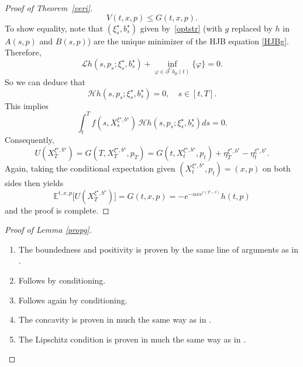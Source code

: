 \documentclass[reqno, 11pt]{amsart}%
\newcommand{\Eop}{\mathbb{E}}
\theoremstyle{definition}
\numberwithin{equation}{section} \numberwithin{theorem}{section}
\begin{document}
\begin{proof}[Proof of Theorem~\ref{veri}]
\begin{equation}
   V(t,x,p) \le G(t,x,p).
   \end{equation} 
   To show equality, note that  $(\xi^\star_s,b^\star_s)$ given by~\eqref{optstr} (with $g$ replaced by $h$ in $A(s,p)$ and $B(s,p)$) are the unique minimizer of the HJB equation \eqref{HJBg}. 
   Therefore, 
   \begin{equation*}
   \mathcal{L} h(s,p_s;\xi^{\star}_s,b^\star_s) + \inf_{\varphi\in\partial^C h_p(t)}\{\varphi\} = 0.
   \end{equation*}
   So we can deduce that
   \begin{equation*}
   \mathcal{H} h(s,p_{s};\xi^{\star}_s,b^{\star}_s) = 0,\quad s\in[t,T].
   \end{equation*}
   This implies 
   \begin{equation*}
   \int_t^T f(s,X^{\xi^\star,b^\star}_s)\,\mathcal{H} h(s,p_s;\xi^{\star}_s,b^{\star}_s)ds = 0.
   \end{equation*}
   Consequently,
   \begin{equation*}
   U(X^{\xi^\star,b^\star}_T)= G(T,X^{\xi^\star,b^\star}_T,p_T) = G(t,X^{\xi^\star,b^\star}_t,p_t) + \eta^{\xi^\star,b^\star}_T - \eta^{\xi^\star,b^\star}_t.
   \end{equation*}
   Again, taking the conditional expectation given $(X^{\xi^\star,b^\star}_t,p_t)=(x,p)$ on both sides then yields
   \begin{equation*}
   \Eop^{t,x,p}\big[U(X^{\xi^\star,b^\star}_T)\big] = G(t,x,p)= -e^{-\alpha x e^{r(T-t)}}h(t,p)
   \end{equation*}
   and the proof is complete.
\end{proof} 

\begin{proof}[Proof of Lemma \ref{propg}]
	\begin{enumerate}
		\item The boundedness and positivity is proven by the same line of arguments as in \cite[Lemma 4.4 (a)]{BaeuerleLeimcke2020}.
		\item Follows by conditioning. 
		\item Follows again by conditioning. 
      \item The concavity is proven in much the same way as in \cite[Lemma 4.4 (c)]{BaeuerleLeimcke2020}.
		\item The Lipschitz condition is proven in much the same way as in \cite[Lemma 6.1 (d)]{BaeuerleRieder2007}.\qedhere
	\end{enumerate}
\end{proof}
\end{document}
